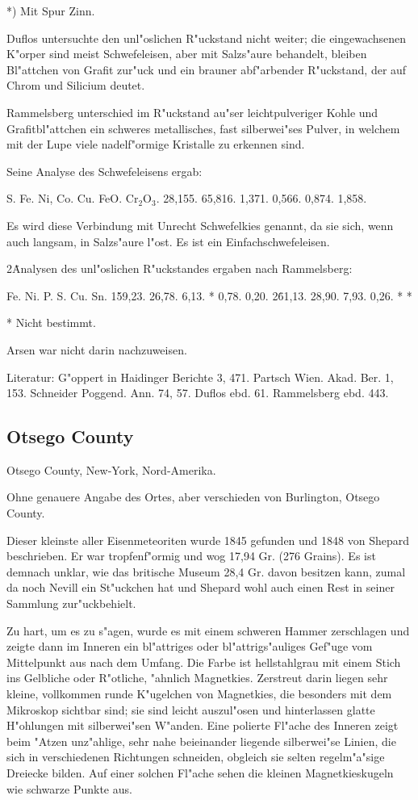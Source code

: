 \documentclass[a4paper, 11pt, oneside]{article}
\begin{document}
*) Mit Spur Zinn.

Duflos untersuchte den unl"oslichen R"uckstand nicht weiter; die eingewachsenen K"orper sind meist Schwefeleisen, aber mit Salzs"aure behandelt, bleiben Bl"attchen von Grafit zur"uck und ein brauner abf"arbender R"uckstand, der auf Chrom und Silicium deutet.

Rammelsberg unterschied im R"uckstand au"ser leichtpulveriger Kohle und Grafitbl"attchen ein schweres metallisches, fast silberwei"ses Pulver, in welchem mit der Lupe viele nadelf"ormige Kristalle zu erkennen sind.

Seine Analyse des Schwefeleisens ergab:

S. Fe. Ni, Co. Cu. FeO. Cr$_{2}$O$_{3}$.  
28,155. 65,816. 1,371. 0,566. 0,874. 1,858.

Es wird diese Verbindung mit Unrecht Schwefelkies genannt, da sie sich, wenn auch langsam, in Salzs"aure l"ost. Es ist ein Einfachschwefeleisen.

2\. Analysen des unl"oslichen R"uckstandes ergaben nach Rammelsberg:

Fe. Ni. P. S. Cu. Sn.  
1\. 59,23. 26,78. 6,13. * 0,78. 0,20.  
2\. 61,13. 28,90. 7,93. 0,26. * *

* Nicht bestimmt.

Arsen war nicht darin nachzuweisen.

Literatur: G"oppert in Haidinger Berichte 3, 471. Partsch Wien. Akad. Ber. 1, 153. Schneider Poggend. Ann. 74, 57. Duflos ebd. 61. Rammelsberg ebd. 443.

\subsection{Otsego County}

Otsego County, New-York, Nord-Amerika.

Ohne genauere Angabe des Ortes, aber verschieden von Burlington, Otsego County.

Dieser kleinste aller Eisenmeteoriten wurde 1845 gefunden und 1848 von Shepard beschrieben. Er war tropfenf"ormig und wog 17,94 Gr. (276 Grains). Es ist demnach unklar, wie das britische Museum 28,4 Gr. davon besitzen kann, zumal da noch Nevill ein St"uckchen hat und Shepard wohl auch einen Rest in seiner Sammlung zur"uckbehielt.

Zu hart, um es zu s"agen, wurde es mit einem schweren Hammer zerschlagen und zeigte dann im Inneren ein bl"attriges oder bl"attrigs"auliges Gef"uge vom Mittelpunkt aus nach dem Umfang. Die Farbe ist hellstahlgrau mit einem Stich ins Gelbliche oder R"otliche, "ahnlich Magnetkies. Zerstreut darin liegen sehr kleine, vollkommen runde K"ugelchen von Magnetkies, die besonders mit dem Mikroskop sichtbar sind; sie sind leicht auszul"osen und hinterlassen glatte H"ohlungen mit silberwei"sen W"anden. Eine polierte Fl"ache des Inneren zeigt beim "Atzen unz"ahlige, sehr nahe beieinander liegende silberwei"se Linien, die sich in verschiedenen Richtungen schneiden, obgleich sie selten regelm"a"sige Dreiecke bilden. Auf einer solchen Fl"ache sehen die kleinen Magnetkieskugeln wie schwarze Punkte aus.
\end{document}
